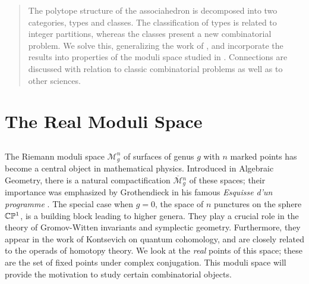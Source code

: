 \documentclass[10pt]{amsart}
\begin{document}
\address{Department of Mathematics, Ohio State University, Columbus, Ohio}
\address{Department of Combinatorics and Optimization, University of Waterloo, Canada}

\begin{abstract}
The polytope structure of the associahedron is decomposed into two categories, types and classes.  The classification of types is related to integer partitions, whereas the classes present a new combinatorial problem.  We solve this, generalizing the work of \cite{r1}, and incorporate the results into properties of the moduli space  studied in \cite{dev}.  Connections are discussed with relation to classic combinatorial problems as well as to other sciences.
\end{abstract}

\maketitle

\baselineskip=15pt

\vspace{-.1in}

%
%

\section {The Real Moduli Space}

\subsection{}
The Riemann moduli space ${\mathcal M}_g^n$ of surfaces of genus $g$ with $n$ marked points has become a central object in mathematical physics.  Introduced in Algebraic Geometry, there is a natural compactification ${\overline{\mathcal M}}{_g^n}$ of these spaces; their importance was emphasized by Grothendieck in his famous \emph{Esquisse d'un programme} \cite{gro}. The special case when $g=0$, the space  of $n$ punctures on the sphere ${\mathbb C}{\mathbb P}^1$, is a building block leading to higher genera. They play a crucial role in the theory of Gromov-Witten invariants and symplectic geometry. Furthermore, they appear in the work of Kontsevich on quantum cohomology, and are closely related to the operads of homotopy theory.  We look at the {\em real} points  of this space; these are the set of fixed points under complex conjugation.  This moduli space will provide the motivation to study certain combinatorial objects.
\end{document}
